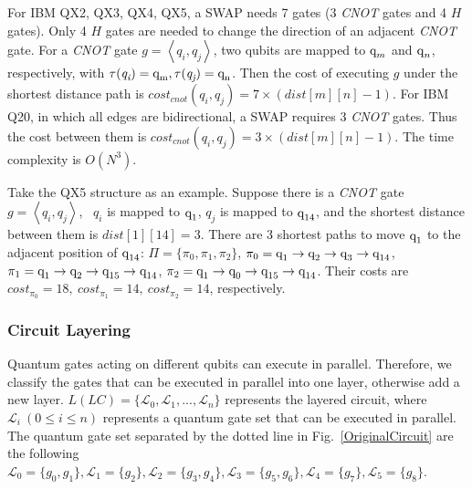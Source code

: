 \documentclass[runningheads]{llncs}
\begin{document}
For IBM QX2, QX3, QX4, QX5, a SWAP needs 7 gates (3 \textit{CNOT} gates and 4 $H$ gates). Only 4 $H$ gates are needed to change the direction of an adjacent \textit{CNOT} gate. 
For a \textit{CNOT} gate $g=\left \langle  \textit{q}_\textit{i},\textit{q}_\textit{j} \right \rangle $,
two qubits are mapped to $\textup{q}_{m}$ and $\textup{q}_{n}$, respectively, with $\tau(\textit{q}_\textit{i})=\textup{q}_{\textup{m}},\tau(\textit{q}_\textit{j})=\textup{q}_{\textup{n}}$. Then the cost of executing $g$ under the shortest distance path is $cost_{cnot}(\textit{q}_\textit{i},\textit{q}_\textit{j})=7 \times( dist[m][n]-1)$. For IBM Q20, in which all edges are bidirectional, a SWAP requires 3 \textit{CNOT} gates. Thus the cost between them is $cost_{cnot}(\textit{q}_\textit{i},\textit{q}_\textit{j})=3 \times( dist[m][n]-1)$. The time complexity is $O (N^{3})$.
\begin{example}
	Take the QX5 structure as an example. Suppose there is a \textit{CNOT} gate $g=\left \langle  \textit{q}_\textit{i}, \textit{q}_\textit{j} \right \rangle $, \ $\textit{q}_\textit{i}$ is mapped to $\textup{q}_{1}$,  $\textit{q}_\textit{j}$ is mapped to $\textup{q}_{\textup{14}}$, and the shortest distance between them  is $dist[1][14]=3$. There are 3 shortest paths to move $\textup{q}_{\textup{1}}$ to the adjacent position of 
$\textup{q}_{\textup{14}}$:
$\Pi=\{\pi_{0},\pi_{1},\pi_{2}\}$, 
$\pi_{0}={\textup{q}_{\textup{1}}\rightarrow \textup{q}_{\textup{2}} \rightarrow \textup{q}_{\textup{3}} \rightarrow \textup{q}_{\textup{14}}}$,
$\pi_{1}={\textup{q}_{\textup{1}}\rightarrow \textup{q}_{\textup{2}} \rightarrow \textup{q}_{\textup{15}} \rightarrow \textup{q}_{\textup{14}}}$,
$\pi_{2}={\textup{q}_{\textup{1}}\rightarrow \textup{q}_{\textup{0}} \rightarrow \textup{q}_{\textup{15}} \rightarrow \textup{q}_{\textup{14}}}$.
Their costs are 
$cost_{\pi_{0}}=18,\ cost_{\pi_{1}}=14,\ cost_{\pi_{2}}=14$, respectively.
\end{example}

\subsubsection{Circuit Layering}
Quantum gates acting on different qubits can execute in parallel. Therefore, we classify the gates that can be executed in parallel into one layer, otherwise add a new layer. $L(LC)=\{\mathcal{L}_{0},\mathcal{L}_{1},...,\mathcal{L}_{n}\}$ represents the layered circuit, where $\mathcal{L}_{i} \ (0 \le i \le n) $ represents a quantum gate set that can be executed in parallel. The quantum gate set separated by the dotted line in Fig.~\ref{OriginalCircuit} are the following $\mathcal{L}_{0}=\{g_{0},g_{1}\},\mathcal{L}_{1}=\{g_{2}\},
 \mathcal{L}_{2}=\{g_{3},g_{4}\},\mathcal{L}_{3}=\{g_{5},g_{6}\},\mathcal{L}_{4}=\{g_{7}\},\mathcal{L}_{5}=\{g_{8}\}$.
\end{document}
